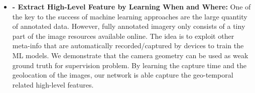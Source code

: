 \begin{itemize}[noitemsep]
  \item \textbf{ -
  Extract High-Level Feature by Learning When and Where:} \newline \newline
  One of the key to the success of machine learning approaches are the
  large quantity of annotated data. However, fully annotated imagery
  only consists of a tiny part of the image resources available online.
  The idea is to exploit other meta-info that are automatically
  recorded/captured by devices to train the ML models.  We demonstrate
  that the camera geometry can be used as weak ground truth for
  supervision problem. By learning the capture time and the geolocation
  of the images, our network is able capture the geo-temporal related
  high-level features. \newline

\end{itemize}
